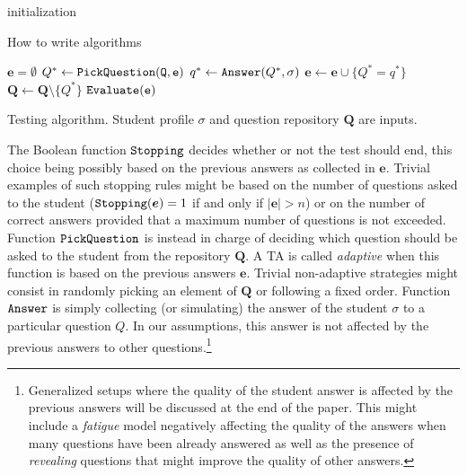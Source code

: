 \documentclass[runningheads]{llncs}
\begin{document}
\begin{algorithm}[H]
    \SetAlgoLined
    initialization\;
    \caption{How to write algorithms}
\end{algorithm}

\begin{algorithm}[htp]
    \begin{algorithmic}[1]
    \STATE $\bm{e}=\emptyset$
        \STATE $Q^* \gets \tt{PickQuestion}(\bm{Q},\bm{e})$
        \STATE $q^* \gets {\tt{Answer}}(Q^*,\sigma)$
        \STATE $\bm{e} \gets \bm{e} \cup \{ Q^*=q^* \}$
        \STATE $\bm{Q} \gets \bm{Q} \setminus \{ Q^*\}$
        \ENDWHILE
         $\tt{Evaluate}(\bm{e})$
    \end{algorithmic}\label{alg:ta}
\caption{Testing algorithm. Student profile $\sigma$ and question repository $\bm{Q}$ are inputs.}
\end{algorithm}


The Boolean function ${\tt Stopping}$ decides whether or not the test should end, this choice being possibly based on the previous answers as collected in $\bm{e}$. Trivial examples of such stopping rules might be based on the number of questions asked to the student (${\tt Stopping}(\bm{e})=1$ if and only if $|\bm{e}|>n$) or on the number of correct answers provided that a maximum number of questions is not exceeded. Function ${\tt PickQuestion}$ is instead in charge of deciding which question should be asked to the student from the repository $\bm{Q}$. A TA is called \emph{adaptive} when this function is based on the previous answers $\bm{e}$. Trivial non-adaptive strategies might consist in randomly picking an element of $\bm{Q}$ or following a fixed order. Function ${\tt Answer}$ is simply collecting (or simulating) the answer of the student $\sigma$ to a particular question $Q$. In our assumptions, this answer is not affected by the previous answers to other questions.\footnote{Generalized setups where the quality of the student answer is affected by the previous answers will be discussed at the end of the paper. This might include a \emph{fatigue} model negatively affecting the quality of the answers when many questions have been already answered as well as the presence of \emph{revealing} questions that might improve the quality of other answers.} 
\end{document}

